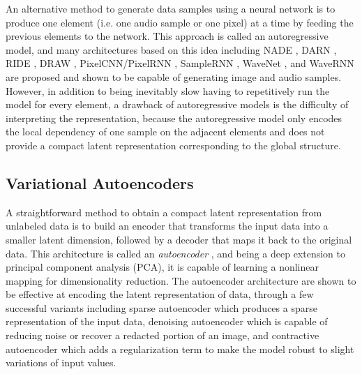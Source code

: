 An alternative method to generate data samples using a neural network is to produce one element (i.e. one audio sample or one pixel) at a time by feeding the previous elements to the network.
This approach is called an autoregressive model, and many architectures based on this idea including NADE \cite{larochelle2011nade}, DARN \cite{gregor2013darn}, RIDE \cite{theis2015ride}, DRAW \cite{gregor2015draw}, PixelCNN/PixelRNN \cite{oord2016pixelrnn}, SampleRNN \cite{mehri2016samplernn}, WaveNet \cite{oord2016wavenet}, and WaveRNN \cite{kalchbrenner2018wavernn} are proposed and shown to be capable of generating image and audio samples.
However, in addition to being inevitably slow having to repetitively run the model for every element, a drawback of autoregressive models is the difficulty of interpreting the representation, because the autoregressive model only encodes the local dependency of one sample on the adjacent elements and does not provide a compact latent representation corresponding to the global structure.

\subsection{Variational Autoencoders}

A straightforward method to obtain a compact latent representation from unlabeled data is to build an encoder that transforms the input data into a smaller latent dimension, followed by a decoder that maps it back to the original data.
This architecture is called an \emph{autoencoder} \cite{bengio2009deeplearning}, and being a deep extension to principal component analysis (PCA), it is capable of learning a nonlinear mapping for dimensionality reduction.
The autoencoder architecture are shown to be effective at encoding the latent representation of data, through a few successful variants including sparse autoencoder \cite{ng2011sparse} which produces a sparse representation of the input data, denoising autoencoder \cite{vincent2008denoising} which is capable of reducing noise or recover a redacted portion of an image, and contractive autoencoder \cite{rifai2011contractive} which adds a regularization term to make the model robust to slight variations of input values.


